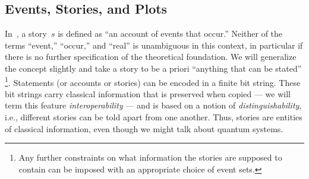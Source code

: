 \documentclass[aps,pra,twocolumn]{revtex4-1}
\theoremstyle{definition}
\theoremstyle{remark}
\begin{document}
\subsection{Events, Stories, and Plots}
\label{ssec:stories_events_plots}
\noindent
In~\cite{FrRen}, a story~$s$ is defined as ``an account of events that occur.''
Neither of the terms ``event,'' ``occur,'' and ``real'' is unambiguous in this context, 
in particular if there is no further specification of the theoretical foundation.
We will generalize the concept slightly and take a story to be a priori ``anything that can be stated'' \footnote{Any further constraints on what information the stories are supposed to contain can be imposed with an appropriate choice of event sets.}.
Statements (or accounts or stories) can be encoded in a finite bit string.
These bit strings carry classical information that is preserved when copied --- we will term this feature \emph{interoperability} --- and is based on a notion of \emph{distinguishability}, i.e., different stories can be told apart from one another.
Thus, stories are entities of classical information, even though we might talk about quantum systems.
\end{document}
